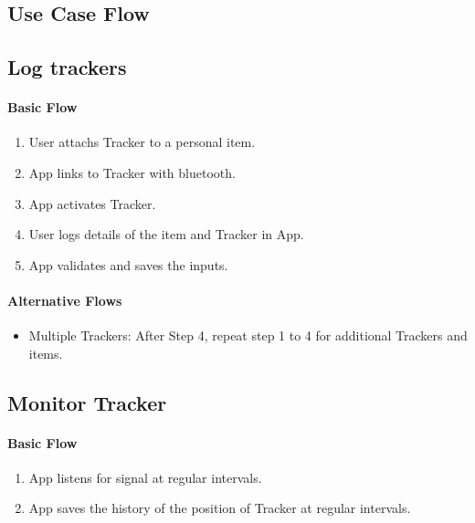 \documentclass[12pt,a4paper]{article}
\begin{document}
    
    \begin{appendices}      
      \section{Use Case Flow}
      \label{appendix:use-case-flow}
        \subsection{Log trackers}
          \paragraph{Basic Flow}
          \begin{enumerate}
            \item User attachs Tracker to a personal item.
            \item App links to Tracker with bluetooth.
            \item App activates Tracker.
            \item User logs details of the item and Tracker in App.
            \item App validates and saves the inputs.
          \end{enumerate}
        
          \paragraph{Alternative Flows}
          \begin{itemize}
            \item Multiple Trackers: After Step 4, repeat step 1 to 4 for additional Trackers and items.
          \end{itemize}
        
        \subsection{Monitor Tracker}
          \paragraph{Basic Flow}
            \begin{enumerate}
              \item App listens for signal at regular intervals.
              \item App saves the history of the position of Tracker at regular intervals.
            \end{enumerate}

\end{appendices}
\end{document}
